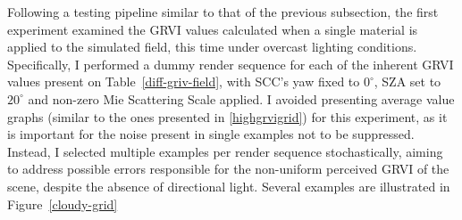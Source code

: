 Following a testing pipeline similar to that of the previous subsection, the first experiment examined the GRVI values calculated when a single material is applied to the simulated field, this time under overcast lighting conditions. Specifically, I performed a dummy render sequence for each of the inherent GRVI values present on Table~\ref{diff-griv-field}, with SCC's yaw fixed to $0^\circ$, SZA set to $20^\circ$ and non-zero Mie Scattering Scale applied. I avoided presenting average value graphs (similar to the ones presented in \ref{highgrvigrid}) for this experiment, as it is important for the noise present in single examples not to be suppressed. Instead, I selected multiple examples per render sequence stochastically, aiming to address possible errors responsible for the non-uniform perceived GRVI of the scene, despite the absence of directional light. Several examples are illustrated in Figure~\ref{cloudy-grid}

